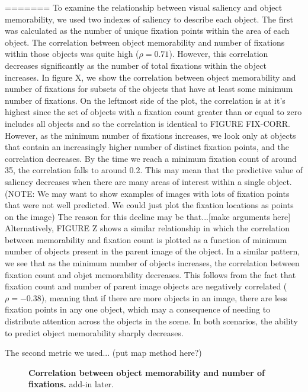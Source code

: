 =======
To examine the relationship between visual saliency and object memorability, we used two indexes of saliency to describe each object. The first was calculated as the number of unique fixation points within the area of each object. The correlation between object memorability and number of fixations within those objects was quite high ($\rho = 0.71$). However, this correlation decreases significantly as the number of total fixations within the object increases. In figure X, we show the correlation between object memorability and number of fixations for subsets of the objects that have at least some minimum number of fixations. On the leftmost side of the plot, the correlation is at it's highest since the set of objects with a fixation count greater than or equal to zero includes all objects and so the correlation is identical to FIGURE FIX-CORR. However, as the minimum number of fixations increases, we look only at objects that contain an increasingly higher number of distinct fixation points, and the correlation decreases. By the time we reach a minimum fixation count of around 35, the correlation falls to around 0.2. This may mean that the predictive value of saliency decreases when there are many areas of interest within a single object. (NOTE: We may want to show examples of images with lots of fixation points that were not well predicted. We could just plot the fixation locations as points on the image) The reason for this decline may be that...[make arguments here] Alternatively, FIGURE Z shows a similar relationship in which the correlation between memorability and fixation count is plotted as a function of minimum number of objects present in the parent image of the object. In a similar pattern, we see that as the minimum number of objects increases, the correlation between fixation count and objet memorability decreases. This follows from the fact that fixation count and number of parent image objects are negatively correlated ($\rho = -0.38$), meaning that if there are more objects in an image, there are less fixation points in any one object, which may a consequence of needing to distribute attention across the objects in the scene. In both scenarios, the ability to predict object memorability sharply decreases.


The second metric we used... (put map method here?)

\begin{figure}[t]
\centering
{}
\vspace{-5mm}\caption{\footnotesize\textbf{Correlation between object memorability and number of fixations.} add-in later. }\label{fig:exampleStimuli}
\end{figure}

